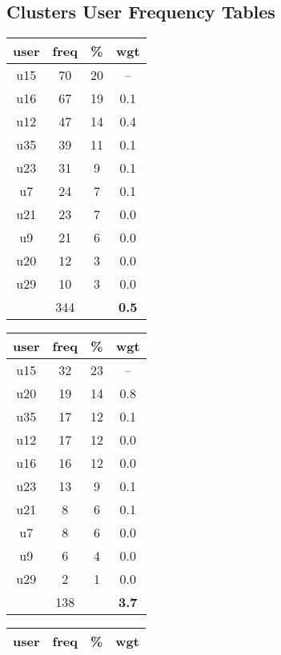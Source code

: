 
\begin{appendices}
\chapter{Clusters User Frequency Tables}\label{ch:clusers-user-frequency-tables}

\begin{table}
\centering
\begin{tabular}{ |c|c|c|c| }
	\hline
	\textbf{user} & \textbf{freq} & \textbf{\%} & \textbf{wgt} \\
	\hline
	u15 & 70 & 20 & -- \\
	u16 & 67 & 19 & 0.1 \\
	u12 & 47 & 14 & 0.4 \\
	u35 & 39 & 11 & 0.1 \\
	u23 & 31 & 9 & 0.1 \\
	u7 & 24 & 7 & 0.1 \\
	u21 & 23 & 7 & 0.0 \\
	u9 & 21 & 6 & 0.0 \\
	u20 & 12 & 3 & 0.0 \\
	u29 & 10 & 3 & 0.0 \\
	 & 344 & & \textbf{0.5} \\
	\hline
\end{tabular}
\begin{tabular}{ |c|c|c|c| }
	\hline
	\textbf{user} & \textbf{freq} & \textbf{\%} & \textbf{wgt} \\
	\hline
	u15 & 32 & 23 & -- \\
	u20 & 19 & 14 & 0.8 \\
	u35 & 17 & 12 & 0.1 \\
	u12 & 17 & 12 & 0.0 \\
	u16 & 16 & 12 & 0.0 \\
	u23 & 13 & 9 & 0.1 \\
	u21 & 8 & 6 & 0.1 \\
	u7 & 8 & 6 & 0.0 \\
	u9 & 6 & 4 & 0.0 \\
	u29 & 2 & 1 & 0.0 \\
	 & 138 & & \textbf{3.7} \\
	\hline
\end{tabular}
\begin{tabular}{ |c|c|c|c| }
	\hline
	\textbf{user} & \textbf{freq} & \textbf{\%} & \textbf{wgt} \\
	\hline

\end{tabular}
\end{table}
\end{appendices}
